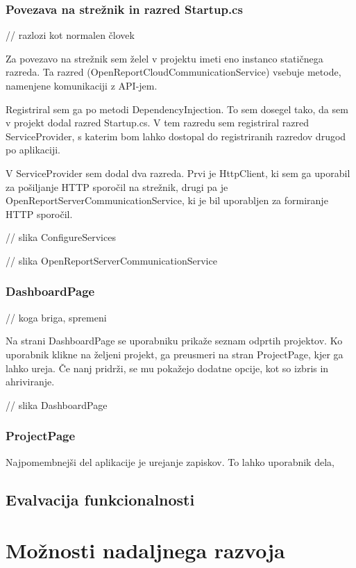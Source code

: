 \documentclass[a4paper, 12pt]{book}
\begin{document}
\subsection{Povezava na strežnik in razred Startup.cs}

// razlozi kot normalen človek

Za povezavo na strežnik sem želel v projektu imeti eno instanco statičnega razreda.
Ta razred (OpenReportCloudCommunicationService) vsebuje metode, namenjene komunikaciji z API-jem.

Registriral sem ga po metodi DependencyInjection.
To sem dosegel tako, da sem v projekt dodal razred Startup.cs.
V tem razredu sem registriral razred ServiceProvider, s katerim bom lahko dostopal do registriranih razredov drugod po aplikaciji.

V ServiceProvider sem dodal dva razreda.
Prvi je HttpClient, ki sem ga uporabil za pošiljanje HTTP sporočil na strežnik, drugi pa je OpenReportServerCommunicationService, ki je bil uporabljen za formiranje HTTP sporočil.

// slika ConfigureServices

// slika OpenReportServerCommunicationService


\subsection{DashboardPage}

// koga briga, spremeni 

Na strani DashboardPage se uporabniku prikaže seznam odprtih projektov.
Ko uporabnik klikne na željeni projekt, ga preusmeri na stran ProjectPage, kjer ga lahko ureja.
Če nanj pridrži, se mu pokažejo dodatne opcije, kot so izbris in ahriviranje.

// slika DashboardPage

\subsection{ProjectPage}

Najpomembnejši del aplikacije je urejanje zapiskov.
To lahko uporabnik dela, 



\section{Evalvacija funkcionalnosti}

\chapter{Možnosti nadaljnega razvoja}
\end{document}
